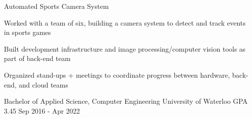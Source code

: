 \documentclass[11pt, a4paper]{awesome-cv}
\begin{document}
\begin{siderules2}
\begin{cventries}
    \cventry
        {\textit{}}
        {Automated Sports Camera System}
        {}
        {}
        {
          \begin{cvitems}
            \item {Worked with a team of six, building a camera system to detect and track events in sports games}
            \item {Built development infrastructure and image processing/computer vision tools as part of back-end team}
            \item {Organized stand-ups + meetings to coordinate progress between hardware, back-end, and cloud teams}
          \end{cvitems}
        }
\end{cventries}
\end{siderules2}
\begin{siderules3}
\begin{cventries}
    \education
    {\fontsize{11pt}{1.3em}\bodyfont\upshape\color{text}\selectfont Bachelor of Applied Science, Computer Engineering}
    {University of Waterloo}
    {GPA 3.45}
    {Sep 2016 - Apr 2022}
    {
      \begin{cvitems}
      \end{cvitems}
    }
\end{cventries}
\end{siderules3}
\end{document}
